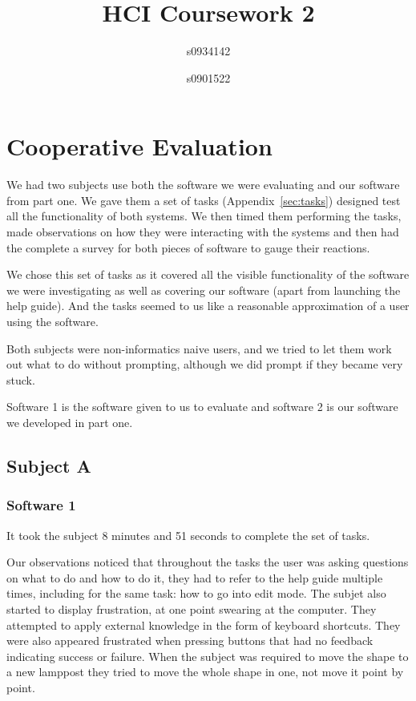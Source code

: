 \documentclass[a4paper,11pt,oneside]{article}
\begin{document}
\title{HCI Coursework 2}
\author{s0934142 \and s0901522}
\maketitle

\section{Cooperative Evaluation}
We had two subjects use both the software we were evaluating and our software from part one.  We gave them a set of tasks (Appendix~\ref{sec:tasks}) designed test all the functionality of both systems.  We then timed them performing the tasks, made observations on how they were interacting with the systems and then had the complete a survey for both pieces of software to gauge their reactions.

We chose this set of tasks as it covered all the visible functionality of the software we were investigating as well as covering our software (apart from launching the help guide).  And the tasks seemed to us like a reasonable approximation of a user using the software.

Both subjects were non-informatics naive users, and we tried to let them work out what to do without prompting, although we did prompt if they became very stuck.

Software 1 is the software given to us to evaluate and software 2 is our software we developed in part one.

\subsection{Subject A}

\subsubsection{Software 1}
It took the subject 8 minutes and 51 seconds to complete the set of tasks. 

Our observations noticed that throughout the tasks the user was asking questions on what to do and how to do it, they had to refer to the help guide multiple times, including for the same task: how to go into edit mode.  The subjet also started to display frustration, at one point swearing at the computer.  They attempted to apply external knowledge in the form of keyboard shortcuts.  They were also appeared frustrated when pressing buttons that had no feedback indicating success or failure.  When the subject was required to move the shape to a new lamppost they tried to move the whole shape in one, not move it point by point.
\end{document}
